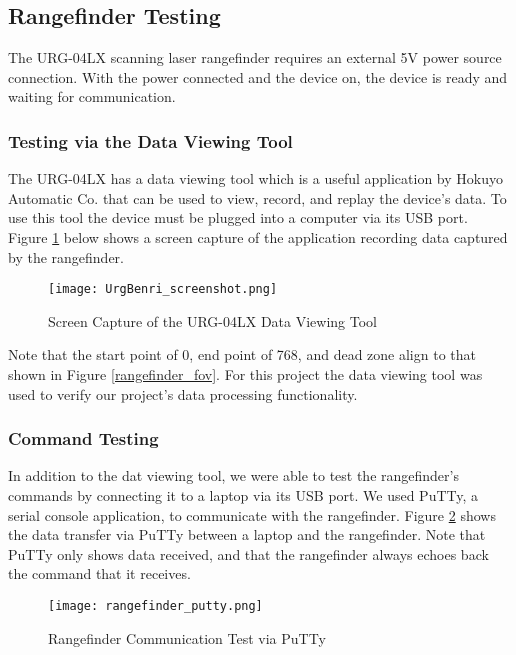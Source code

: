 \subsection{Rangefinder Testing}
The URG-04LX scanning laser rangefinder requires an external 5V power source connection. With the power connected and the device on, the device is ready and waiting for communication.

\subsubsection{Testing via the Data Viewing Tool}
The URG-04LX has a data viewing tool which is a useful application by Hokuyo Automatic Co. that can be used to view, record, and replay the device's data. To use this tool the device must be plugged into a computer via its USB port. Figure \ref{URGBenriStandard_pic} below shows a screen capture of the application recording data captured by the rangefinder.

\begin{figure}[H]
	\centerline{\texttt{[image: UrgBenri\_screenshot.png]}}
	\caption{Screen Capture of the URG-04LX Data Viewing Tool \cite{URGBenriStandard_ref}}
	\label{URGBenriStandard_pic}
\end{figure}

Note that the start point of 0, end point of 768, and dead zone align to that shown in Figure \ref{rangefinder_fov}. For this project the data viewing tool was used to verify our project's data processing functionality.

\subsubsection{Command Testing}
In addition to the dat viewing tool, we were able to test the rangefinder's commands by connecting it to a laptop via its USB port. We used PuTTy, a serial console application, to communicate with the rangefinder. Figure \ref{rangefinder_putty} shows the data transfer via PuTTy between a laptop and the rangefinder. Note that PuTTy only shows data received, and that the rangefinder always echoes back the command that it receives.

\begin{figure}[H]
	\centerline{\texttt{[image: rangefinder\_putty.png]}}
	\caption{Rangefinder Communication Test via PuTTy}
	\label{rangefinder_putty}
\end{figure}

